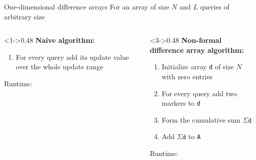 \documentclass[
    t,10pt,
    handout
]{beamer}
\begin{document}
\begin{frame}{One-dimensional difference arrays}
    For an array of size \( N \) and \( L \) queries of arbitrary size
    \begin{columns}[T]
        \begin{column}<1->{0.48\textwidth}
            \textbf{Naive algorithm:} 
            \begin{enumerate}
                \item For every query add its update value over the whole update range
            \end{enumerate}
            \vspace{.2cm}
            Runtime: 
        \end{column}
        \begin{column}<3->{0.48\textwidth}
            \textbf{Non-formal difference array algorithm:}
            \begin{enumerate}
                \item Initialize array \texttt{d} of size \( N \) with zero entries  
                \item For every query add two markers to \texttt{d} 
                \item Form the cumulative sum \( \Sigma\texttt{d} \) 
                \item Add \( \Sigma\texttt{d} \) to \texttt{A} 
            \end{enumerate}
            \vspace{.2cm}
            Runtime:  
        \end{column}
    \end{columns}
\end{frame}
\end{document}
